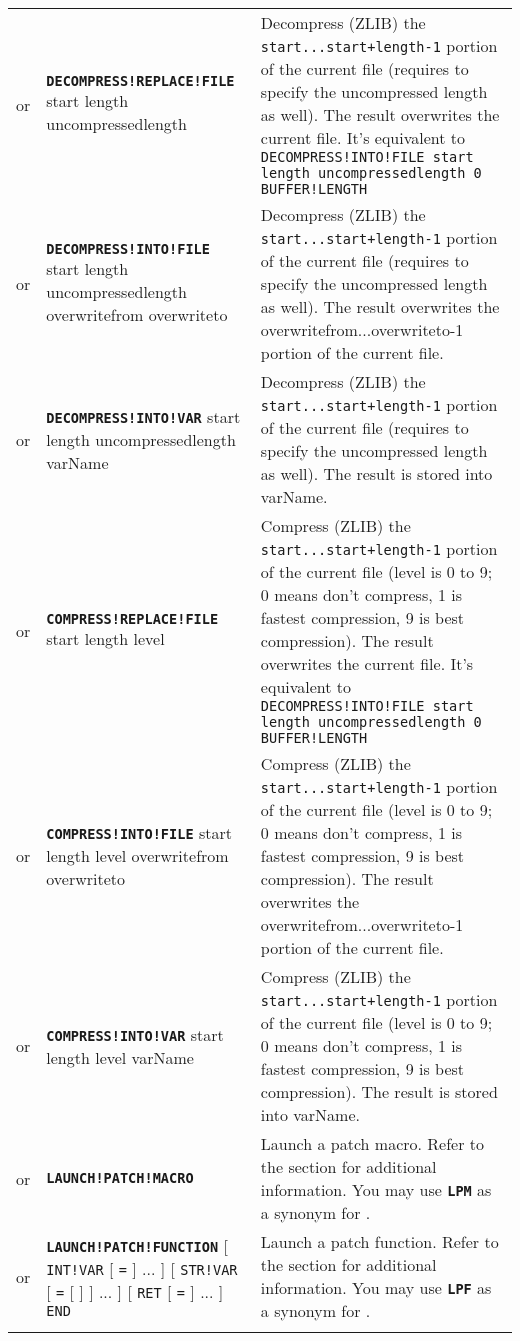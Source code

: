\documentclass{article}
\def\ttref#1{\ahrefloc{#1}{\tt #1}}
\def\DEFINE#1{{\tt \bf #1}\label{#1}\index{#1}}
\def\t#1{{\tt #1}}
\def\Ob{{\color{red} [ }}
\def\Oe{{\color{red} ] }}
\begin{document}
\begin{tabular}{cp{10in}|p{10in}}
or & \DEFINE{DECOMPRESS!REPLACE!FILE} start length uncompressedlength &
	Decompress (ZLIB) the \verb/start...start+length-1/ portion of the current
	file (requires to specify the uncompressed length as well). The result overwrites
	the current file. It's equivalent to
	\verb+DECOMPRESS!INTO!FILE start length uncompressedlength 0 BUFFER!LENGTH+
\\
or & \DEFINE{DECOMPRESS!INTO!FILE} start length uncompressedlength overwritefrom
  overwriteto &
	Decompress (ZLIB) the \verb/start...start+length-1/ portion of the current
	file (requires to specify the uncompressed length as well). The result overwrites
	the overwritefrom...overwriteto-1 portion of the current file.
\\
or & \DEFINE{DECOMPRESS!INTO!VAR} start length uncompressedlength varName &
	Decompress (ZLIB) the \verb/start...start+length-1/ portion of the current
	file (requires to specify the uncompressed length as well). The result is stored
	into varName.
\\

or & \DEFINE{COMPRESS!REPLACE!FILE} start length level &
	Compress (ZLIB) the \verb/start...start+length-1/ portion of the current
	file (level is 0 to 9; 0 means don't compress, 1 is fastest compression, 9 is best
	compression). The result overwrites
	the current file. It's equivalent to
	\verb+DECOMPRESS!INTO!FILE start length uncompressedlength 0 BUFFER!LENGTH+
\\
or & \DEFINE{COMPRESS!INTO!FILE} start length level overwritefrom
  overwriteto &
	Compress (ZLIB) the \verb/start...start+length-1/ portion of the current
	file (level is 0 to 9; 0 means don't compress, 1 is fastest compression, 9 is best
	compression). The result overwrites
	the overwritefrom...overwriteto-1 portion of the current file.
\\
or & \DEFINE{COMPRESS!INTO!VAR} start length level varName &
	Compress (ZLIB) the \verb/start...start+length-1/ portion of the current
	file (level is 0 to 9; 0 means don't compress, 1 is fastest compression, 9 is best
	compression). The result is stored into varName.
\\
or & \DEFINE{LAUNCH!PATCH!MACRO} \ttref{String} &
        Launch a patch macro. Refer to the \ttref{macros} section for
        additional information. You may use \DEFINE{LPM} as a synonym
        for \ttref {LAUNCH!PATCH!MACRO}.
\\
or & \DEFINE{LAUNCH!PATCH!FUNCTION} \ttref{String}
     \Ob \t{INT!VAR} \ttref{variable} \Ob \t{=} \ttref{value} \Oe ... \Oe
     \Ob \t{STR!VAR} \ttref{variable} \Ob \t{=} \Ob \ttref{EVALUATE!BUFFER}
     \Oe \ttref{String} \Oe ... \Oe
     \Ob \t{RET} \ttref{variable} \Ob \t{=} \ttref{String} \Oe ... \Oe
     \t{END} &
        Launch a patch function. Refer to the \ttref{Functions} section for
        additional information. You may use \DEFINE{LPF} as a synonym
        for \ttref{LAUNCH!PATCH!FUNCTION}.
\\
\\


\end{tabular}
\end{document}
